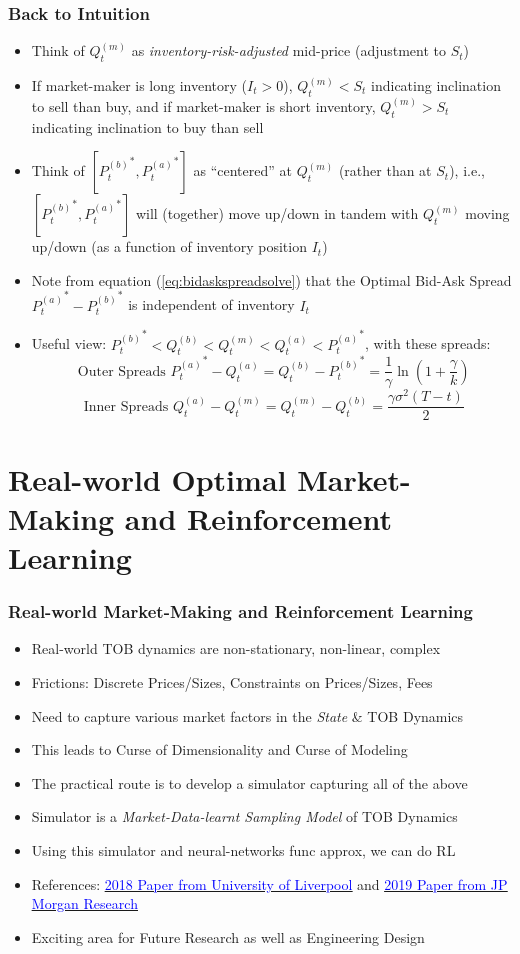 \documentclass[handout]{beamer}
\begin{document}
\begin{frame}
\frametitle{Back to Intuition}
\pause
\begin{itemize}[<+->]
\item Think of $Q_t^{(m)}$ as {\em inventory-risk-adjusted} mid-price (adjustment to $S_t$)
\item If market-maker is long inventory ($I_t > 0$), $Q_t^{(m)} < S_t$ indicating inclination to sell than buy, and if market-maker is short inventory, $Q_t^{(m)} > S_t$ indicating inclination to buy than sell
\item Think of $[{P_t^{(b)}}^*, {P_t^{(a)}}^*]$ as ``centered'' at $Q_t^{(m)}$ (rather than at $S_t$), i.e., $[{P_t^{(b)}}^*, {P_t^{(a)}}^*]$ will (together) move up/down in tandem with $Q_t^{(m)}$ moving up/down (as a function of inventory position $I_t$)
\item Note from equation (\ref{eq:bidaskspreadsolve}) that the Optimal Bid-Ask Spread ${P_t^{(a)}}^* - {P_t^{(b)}}^*$ is independent of inventory $I_t$
\item Useful view: ${P_t^{(b)}}^* < Q_t^{(b)} < Q_t^{(m)} < Q_t^{(a)} < {P_t^{(a)}}^*$, with these spreads:
$$\mbox{ Outer Spreads } {P_t^{(a)}}^* - Q_t^{(a)} = Q_t^{(b)}  - {P_t^{(b)}}^* = \frac 1 {\gamma} \ln{(1 + \frac {\gamma} k)}$$
$$\mbox{ Inner Spreads } Q_t^{(a)} - Q_t^{(m)} = Q_t^{(m)} - Q_t^{(b)} = \frac {\gamma \sigma^2(T-t)} 2$$
\end{itemize}
\end{frame}


\section{Real-world Optimal Market-Making and Reinforcement Learning}

\begin{frame}
\frametitle{Real-world Market-Making and Reinforcement Learning}
\pause
\begin{itemize}[<+->]
\item Real-world TOB dynamics are non-stationary, non-linear, complex
\item Frictions: Discrete Prices/Sizes, Constraints on Prices/Sizes, Fees
\item Need to capture various market factors in the {\em State} \& TOB Dynamics
\item This leads to Curse of Dimensionality and Curse of Modeling
\item The practical route is to develop a simulator capturing all of the above
\item Simulator is a {\em Market-Data-learnt Sampling Model} of TOB Dynamics 
\item Using this simulator and neural-networks func approx, we can do RL
\item References: \href{https://arxiv.org/pdf/1804.04216.pdf}{\underline{\textcolor{blue}{2018 Paper from University of Liverpool}}} and 
\href{https://arxiv.org/pdf/1911.05892.pdf}{\underline{\textcolor{blue}{2019 Paper from JP Morgan Research}}}
\item Exciting area for Future Research as well as Engineering Design
\end{itemize}
\end{frame}
\end{document}
